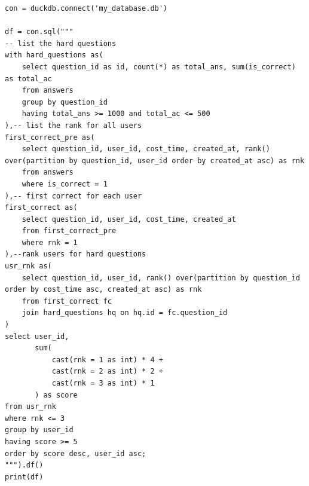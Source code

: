 \documentclass[12pt,a4paper]{article}
\begin{document}
\begin{enumerate}
\begin{enumerate}
\begin{verbatim}
con = duckdb.connect('my_database.db')

df = con.sql("""
-- list the hard questions
with hard_questions as(
    select question_id as id, count(*) as total_ans, sum(is_correct) as total_ac
    from answers
    group by question_id
    having total_ans >= 1000 and total_ac <= 500
),-- list the rank for all users
first_correct_pre as(
    select question_id, user_id, cost_time, created_at, rank() over(partition by question_id, user_id order by created_at asc) as rnk
    from answers
    where is_correct = 1
),-- first correct for each user
first_correct as(
    select question_id, user_id, cost_time, created_at
    from first_correct_pre
    where rnk = 1
),--rank users for hard questions
usr_rnk as(
    select question_id, user_id, rank() over(partition by question_id order by cost_time asc, created_at asc) as rnk
    from first_correct fc
    join hard_questions hq on hq.id = fc.question_id
)
select user_id, 
       sum(
           cast(rnk = 1 as int) * 4 +
           cast(rnk = 2 as int) * 2 +
           cast(rnk = 3 as int) * 1
       ) as score
from usr_rnk
where rnk <= 3
group by user_id
having score >= 5
order by score desc, user_id asc;
""").df()
print(df)


\end{verbatim}
\end{enumerate}
\end{enumerate}
\end{document}
